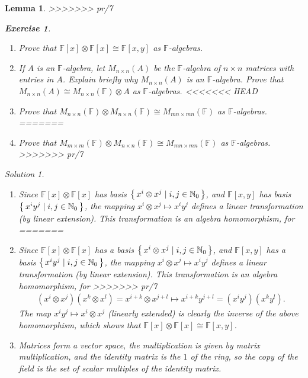 \documentclass{article}
\newtheorem{Lemma}{Lemma}
\theoremstyle{definition}
\newtheorem{Exercise}{Exercise}
\theoremstyle{remark}
\newtheorem*{Solution*}{Solution}
\theoremstyle{underline}
\theoremstyle{underline}
\begin{document}
\begin{Lemma}
>>>>>>> pr/7
	\begin{Exercise}
		\begin{enumerate}[label=(\alph*)]
			\item Prove that $\mathbb{F}[x] \otimes \mathbb{F}[x] \cong \mathbb{F}[x,y]$ as $\mathbb{F}$-algebras.
			\item  If $A$ is an $\mathbb{F}$-algebra, let $M_{n \times n}(A)$ be the $\mathbb{F}$-algebra of $n \times n$ matrices with entries in $A$. Explain briefly why $M_{n\times n}(A)$ is an $\mathbb{F}$-algebra. Prove that $M_{n \times n}(A) \cong M_{n \times n}(\mathbb F) \otimes A$ as $\mathbb{F}$-algebras.
<<<<<<< HEAD
			\item  Prove that $M_{n\times n}(\mathbb F) \otimes M_{n\times n}(\mathbb F) \cong M_{mn \times mn}(\mathbb F)$ as $\mathbb F$-algebras.
=======
			\item  Prove that $M_{m\times m}(\mathbb F) \otimes M_{n\times n}(\mathbb F) \cong M_{mn \times mn}(\mathbb F)$ as $\mathbb F$-algebras.
>>>>>>> pr/7
		\end{enumerate}
	\end{Exercise}
	\begin{Solution*}
		\begin{enumerate}[label=(\alph*)]
<<<<<<< HEAD
			\item Since $\mathbb F[x] \otimes \mathbb F[x]$ has basis $\qty{\, x^i \otimes x^j \mid i, j \in \mathbb N_0 \,}$, and $\mathbb F[x, y]$ has basis $\qty{\, x^i y^j \mid i, j \in \mathbb N_0 \,}$, the mapping $x^i \otimes x^j \mapsto x^i y^j$ defines a linear transformation (by linear extension). This transformation is an algebra homomorphism, for
=======
			\item Since $\mathbb F[x] \otimes \mathbb F[x]$ has a basis $\qty{\, x^i \otimes x^j \mid i, j \in \mathbb N_0 \,}$, and $\mathbb F[x, y]$ has a basis $\qty{\, x^i y^j \mid i, j \in \mathbb N_0 \,}$, the mapping $x^i \otimes x^j \mapsto x^i y^j$ defines a linear transformation (by linear extension). This transformation is an algebra homomorphism, for
>>>>>>> pr/7
			\begin{gather*}
			(x^i \otimes x^j) (x^k \otimes x^l) = x^{i + k} \otimes x^{j + l} \mapsto x^{i + k} y^{j + l} = (x^i y^j) (x^k y^l).
			\end{gather*}
			The map $x^i y^j \mapsto x^i \otimes x^j$ (linearly extended) is clearly the inverse of the above homomorphism, which shows that $\mathbb F[x] \otimes \mathbb F[x] \cong \mathbb F[x, y]$.
			\item Matrices form a vector space, the multiplication is given by matrix multiplication, and the identity matrix is the $1$ of the ring, so the copy of the field is the set of scalar multiples of the identity matrix.
			

\end{enumerate}
\end{Solution*}
\end{Lemma}
\end{document}

